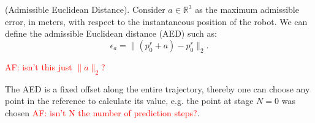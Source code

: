 \begin{definition}(Admissible Euclidean Distance). Consider $a \in \mathbb{R}^3$ as the maximum admissible error, in meters, with respect to the instantaneous position of the robot. We can define the admissible Euclidean distance (AED) such as:
\begin{equation}
	\epsilon_{a} = \|(p_0^r+a)-p_0^r\|_2.\label{eq:aed}%
\end{equation}

\textcolor{red}{AF: isn't this just $\|a\|_2$?}

The AED is a fixed offset along the entire trajectory, thereby one can choose any point in the reference to calculate its value, e.g. the point at stage $N=0$ was chosen \textcolor{red}{AF: isn't N the number of prediction steps?}.
\end{definition}

